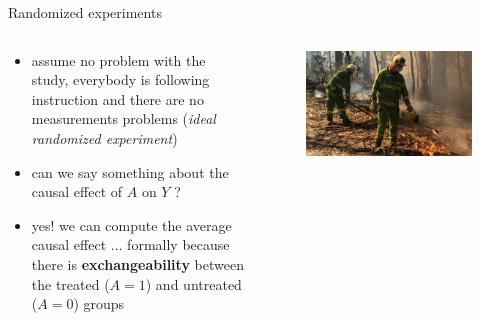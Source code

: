 \documentclass{beamer}
\begin{document}
\begin{frame}{Randomized experiments}
  \begin{columns}

    \begin{column}{0.5\textwidth}
  \begin{itemize}
    \item<1-> assume no problem with the study, everybody is following instruction and
      there are no measurements problems (\emph{ideal randomized experiment})
    \item<2-> can we say something about the causal effect of $A$ on $Y$ ?
    \item<3-> yes! we can compute the average causal effect ... formally because there
      is \textbf{exchangeability} between the treated ($A=1$) and untreated ($A=0$) groups
  \end{itemize}
    \end{column}
    \begin{column}{0.5\textwidth}
     \begin{figure}
       \includegraphics[width = \textwidth]{crew}
     \end{figure}
    \end{column}
  \end{columns}
\end{frame}
\end{document}
